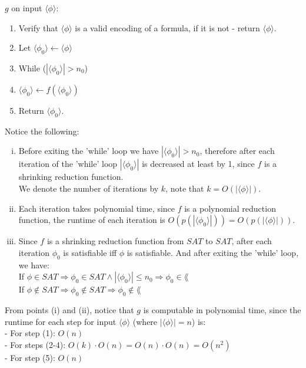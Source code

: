 $g$ on input $\langle \phi \rangle$:
\begin{enumerate}[1., itemsep=5pt]

    \item Verify that $\langle \phi \rangle$ is a valid encoding of a formula, if it is not - return $\langle \phi \rangle$.

    \item Let $\langle \phi_0 \rangle \leftarrow \langle \phi \rangle$
    \item While ($|\langle \phi_0 \rangle| > n_0$)
    \item \qquad $\langle \phi_0 \rangle \leftarrow f(\langle \phi_0 \rangle)$

    \item Return $\langle \phi_0 \rangle$.

\end{enumerate}
Notice the following:
\begin{enumerate}[(i), itemsep=5pt]
    \item Before exiting the 'while' loop we have $|\langle \phi_0 \rangle| > n_0$, therefore after each iteration of the 'while' loop
          $|\langle \phi_0 \rangle|$ is decreased at least by 1, since $f$ is a shrinking reduction function. \\
          We denote the number of iterations by $k$, note that $k=O(|\langle \phi \rangle|)$.

    \item Each iteration takes polynomial time, since $f$ is a polynomial reduction function,
          the runtime of each iteration is $O(p(|\langle \phi_0 \rangle|)) = O(p(|\langle \phi \rangle|))$.

    \item Since $f$ is a shrinking reduction function from $SAT$ to $SAT$, after each iteration $\phi_0$ is satisfiable iff $\phi$ is satisfiable.
          And after exiting the 'while' loop, we have: \\
          If $\phi \in SAT \Rightarrow \phi_0 \in SAT \wedge |\langle \phi_0 \rangle| \leq n_0 \Rightarrow \phi_0 \in \lang$ \\
          If $\phi \notin SAT \Rightarrow \phi_0 \notin SAT \Rightarrow \phi_0 \notin \lang$

\end{enumerate}

From points (i) and (ii), notice that $g$ is computable in polynomial time, since the runtime for each step
for input $\langle \phi \rangle$ (where $|\langle \phi \rangle| = n$) is: \\
- For step  (1):   $O(n)$                                         \\
- For steps (2-4): $O(k) \cdot O(n) = O(n) \cdot O(n) = O(n^2)$   \\
- For step  (5):   $O(n)$                                         \\

